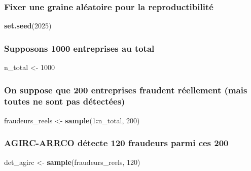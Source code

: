 \documentclass[
]{article}
\newenvironment{Shaded}{\begin{snugshade}}{\end{snugshade}}
\newcommand{\DecValTok}[1]{\textcolor[rgb]{0.00,0.00,0.81}{#1}}
\newcommand{\FunctionTok}[1]{\textcolor[rgb]{0.13,0.29,0.53}{\textbf{#1}}}
\newcommand{\NormalTok}[1]{#1}
\newcommand{\OtherTok}[1]{\textcolor[rgb]{0.56,0.35,0.01}{#1}}
\newcommand{\SpecialCharTok}[1]{\textcolor[rgb]{0.81,0.36,0.00}{\textbf{#1}}}
\begin{document}
\subsubsection{Fixer une graine aléatoire pour la
reproductibilité}\label{fixer-une-graine-aluxe9atoire-pour-la-reproductibilituxe9}

\begin{Shaded}
\begin{Highlighting}[]
\FunctionTok{set.seed}\NormalTok{(}\DecValTok{2025}\NormalTok{)}
\end{Highlighting}
\end{Shaded}

\subsubsection{Supposons 1000 entreprises au
total}\label{supposons-1000-entreprises-au-total}

\begin{Shaded}
\begin{Highlighting}[]
\NormalTok{n\_total }\OtherTok{\textless{}{-}} \DecValTok{1000}
\end{Highlighting}
\end{Shaded}

\subsubsection{On suppose que 200 entreprises fraudent réellement (mais
toutes ne sont pas
détectées)}\label{on-suppose-que-200-entreprises-fraudent-ruxe9ellement-mais-toutes-ne-sont-pas-duxe9tectuxe9es}

\begin{Shaded}
\begin{Highlighting}[]
\NormalTok{fraudeurs\_reels }\OtherTok{\textless{}{-}} \FunctionTok{sample}\NormalTok{(}\DecValTok{1}\SpecialCharTok{:}\NormalTok{n\_total, }\DecValTok{200}\NormalTok{)}
\end{Highlighting}
\end{Shaded}

\subsubsection{AGIRC-ARRCO détecte 120 fraudeurs parmi ces
200}\label{agirc-arrco-duxe9tecte-120-fraudeurs-parmi-ces-200}

\begin{Shaded}
\begin{Highlighting}[]
\NormalTok{det\_agirc }\OtherTok{\textless{}{-}} \FunctionTok{sample}\NormalTok{(fraudeurs\_reels, }\DecValTok{120}\NormalTok{)}
\end{Highlighting}
\end{Shaded}
\end{document}
